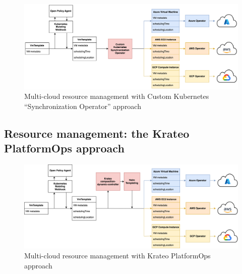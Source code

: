 \begin{figure}[htb]
  \centering
  \includegraphics[width=1\linewidth]{images/k8s_operator.png}
  \caption{Multi-cloud resource management with Custom Kubernetes ``Synchronization Operator'' approach}
  \label{fig:k8s_operator}
\end{figure}

\subsection{Resource management: the Krateo PlatformOps approach}

\begin{figure}[htb]
  \centering
  \includegraphics[width=1\linewidth]{images/krateo.png}
  \caption{Multi-cloud resource management with Krateo PlatformOps approach}
  \label{fig:krateo}
\end{figure}


